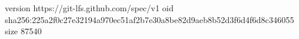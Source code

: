 version https://git-lfs.github.com/spec/v1
oid sha256:225a2f0c27e32194a970ec51af2b7e30a8be82d9aeb8b52d3f6d4f6d8c346055
size 87540

